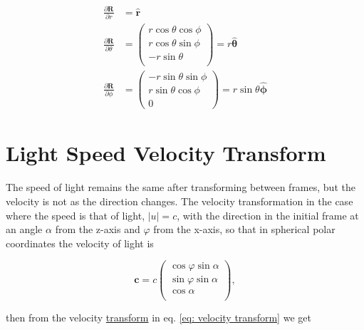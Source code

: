 \begin{equation}
	\begin{aligned}
		\frac{\partial\mathbf{R}}{\partial r}      & = \mathbf{\hat{\text{$r$}}} \\
		\frac{\partial\mathbf{R}}{\partial \theta} & =
		\begin{pmatrix}
			r \cos\theta \cos\phi \\
			r \cos\theta \sin\phi \\
			-r \sin\theta         \\
		\end{pmatrix}
		=r\mathbf{\hat{\text{$\theta$}}}                                         \\
		\frac{\partial\mathbf{R}}{\partial \phi}   & =
		\begin{pmatrix}
			-r \sin\theta \sin\phi \\
			r \sin\theta \cos\phi  \\
			0
		\end{pmatrix}
		= r \sin\theta \mathbf{\hat{\text{$\phi$}}}
	\end{aligned}
\end{equation}

\section{Light Speed Velocity Transform}

The speed of light remains the same after transforming between frames, but the velocity is not as the direction changes.
The velocity transformation in the case where the speed is that of light, $|u|=c$, with the direction in the initial frame at an angle $\alpha$ from the z-axis and $\varphi$ from the x-axis, so that in spherical polar coordinates the velocity of light is

\begin{equation}
	\mathbf{c} = c
	\begin{pmatrix}
		\cos{\varphi}\sin{\alpha} \\
		\sin{\varphi}\sin{\alpha} \\
		\cos{\alpha}              \\
	\end{pmatrix},
\end{equation}

then from the velocity \hyperlink{def-transform}{transform} in eq.
\eqref{eq: velocity transform} we get

